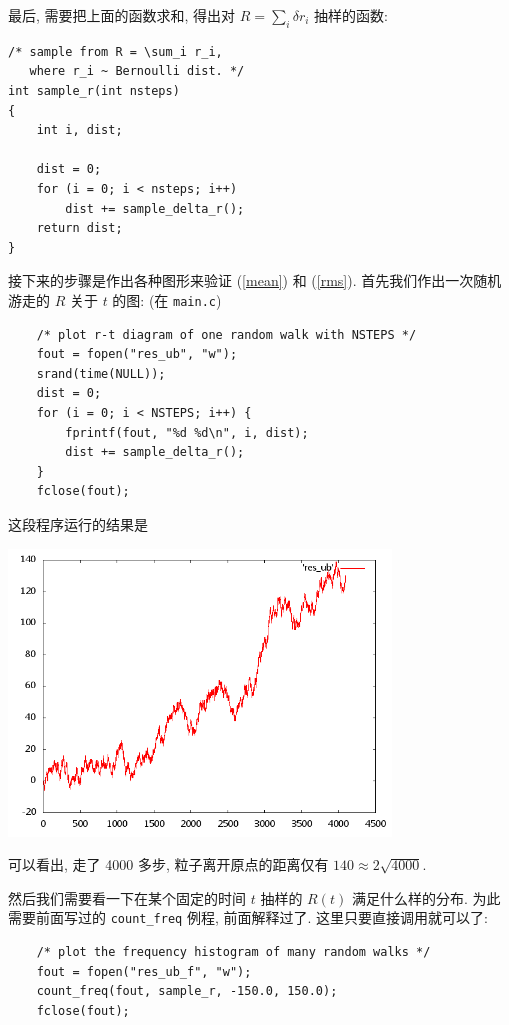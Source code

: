 \documentclass{ctexart}
\begin{document}
最后, 需要把上面的函数求和, 得出对 $R = \sum_i \delta r_i$
抽样的函数:
\begin{verbatim}
/* sample from R = \sum_i r_i,
   where r_i ~ Bernoulli dist. */
int sample_r(int nsteps)
{
    int i, dist;

    dist = 0;
    for (i = 0; i < nsteps; i++)
        dist += sample_delta_r();
    return dist;
}
\end{verbatim}

接下来的步骤是作出各种图形来验证 (\ref{mean}) 和 (\ref{rms}).
首先我们作出一次随机游走的 $R$ 关于 $t$ 的图: (在 \verb|main.c|)
\begin{verbatim}
    /* plot r-t diagram of one random walk with NSTEPS */
    fout = fopen("res_ub", "w");
    srand(time(NULL));
    dist = 0;
    for (i = 0; i < NSTEPS; i++) {
        fprintf(fout, "%d %d\n", i, dist);
        dist += sample_delta_r();
    }
    fclose(fout);
\end{verbatim}

这段程序运行的结果是
\begin{center}
\includegraphics[width=4in]{plot_ub.png}
\end{center}
可以看出, 走了 4000 多步, 粒子离开原点的距离仅有
$140\approx2\sqrt{4000}$.

然后我们需要看一下在某个固定的时间 $t$ 抽样的 $R(t)$
满足什么样的分布. 为此需要前面写过的 \verb|count_freq|
例程, 前面解释过了. 这里只要直接调用就可以了:
\begin{verbatim}
    /* plot the frequency histogram of many random walks */
    fout = fopen("res_ub_f", "w");
    count_freq(fout, sample_r, -150.0, 150.0);
    fclose(fout);
\end{verbatim}
\end{document}
